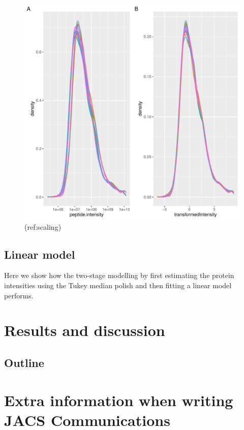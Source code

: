 \documentclass[journal=jacsat,manuscript=article]{achemso}
\begin{document}
\begin{figure}
\centering
\includegraphics{Prolfqua_files/figure-latex/scaling-1.pdf}
\caption{(ref:scaling)}
\end{figure}

\hypertarget{linear-model}{%
\subsection{Linear model}\label{linear-model}}

Here we show how the two-stage modelling by first estimating the protein
intensities using the Tukey median polish and then fitting a linear
model performs.

\hypertarget{results-and-discussion}{%
\section{Results and discussion}\label{results-and-discussion}}

\hypertarget{outline}{%
\subsection{Outline}\label{outline}}

\hypertarget{extra-information-when-writing-jacs-communications}{%
\section{Extra information when writing JACS
Communications}\label{extra-information-when-writing-jacs-communications}}
\end{document}
